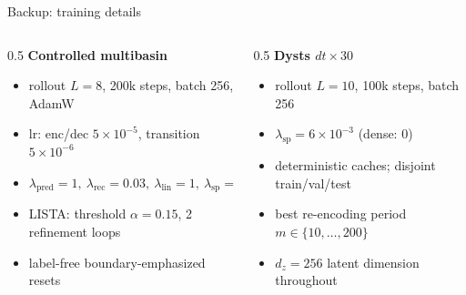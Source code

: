 \documentclass[aspectratio=169,10pt]{beamer}
\begin{document}
\begin{frame}{Backup: training details}
  \vspace{0.3em}
  \begin{columns}[T]
    \begin{column}{0.5\textwidth}
      \textbf{Controlled multibasin}
      \begin{itemize}\footnotesize\setlength\itemsep{0.4em}
        \item rollout $L=8$, 200k steps, batch 256, AdamW
        \item lr: enc/dec $5\!\times\!10^{-5}$, transition $5\!\times\!10^{-6}$
        \item $\lambda_{\text{pred}}\!=\!1,\ \lambda_{\text{rec}}\!=\!0.03,\ \lambda_{\text{lin}}\!=\!1,\ \lambda_{\text{sp}}\!=\!3\!\times\!10^{-3}$
        \item LISTA: threshold $\alpha\!=\!0.15$, 2 refinement loops
        \item label-free boundary-emphasized resets
      \end{itemize}
    \end{column}
    \begin{column}{0.5\textwidth}
      \textbf{Dysts $dt\times30$}
      \begin{itemize}\footnotesize\setlength\itemsep{0.4em}
        \item rollout $L=10$, 100k steps, batch 256
        \item $\lambda_{\text{sp}}=6\!\times\!10^{-3}$ (dense: $0$)
        \item deterministic caches; disjoint train/val/test
        \item best re-encoding period $m\in\{10,\dots,200\}$
        \item $d_z=256$ latent dimension throughout
      \end{itemize}
    \end{column}
  \end{columns}
\end{frame}
\end{document}
